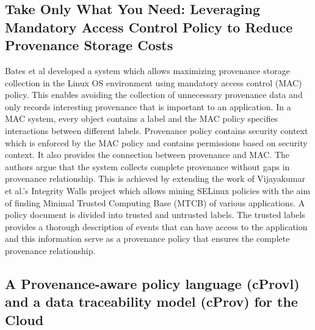\subsection{Take Only What You Need: Leveraging Mandatory Access Control Policy to Reduce Provenance Storage Costs}

Bates et al \cite{Bates:2015:TOY:2814579.2814586} developed a system which allows maximizing provenance storage collection in the Linux OS environment using mandatory access control (MAC) policy. This enables avoiding the collection of unnecessary provenance data and only records interesting provenance that is important to an application. In a MAC system, every object contains a label and the MAC policy specifies interactions between different labels. Provenance policy contains security context which is enforced by the MAC policy and contains permissions based on security context. It also provides the connection between provenance and MAC. The authors argue that the system collects complete provenance without gaps in provenance relationship. This is achieved by extending the work of Vijayakumar et al.’s \cite{asiaccs12-vijayakumar} Integrity Walls project which allows mining SELinux policies with the aim of finding Minimal Trusted Computing Base (MTCB) of various applications. A policy document is divided into trusted and untrusted labels. The trusted labels provides a thorough description of events that can have access to the application and this information serve as a provenance policy that ensures the complete provenance relationship.

\subsection{A Provenance-aware policy language (cProvl) and a data traceability model (cProv) for the Cloud}

